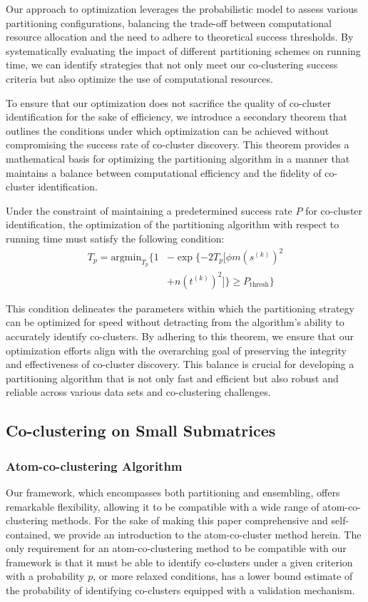 \documentclass[journal]{IEEEtran}
\begin{document}
Our approach to optimization leverages the probabilistic model to assess various partitioning configurations, balancing the trade-off between computational resource allocation and the need to adhere to theoretical success thresholds. By systematically evaluating the impact of different partitioning schemes on running time, we can identify strategies that not only meet our co-clustering success criteria but also optimize the use of computational resources.

To ensure that our optimization does not sacrifice the quality of co-cluster identification for the sake of efficiency, we introduce a secondary theorem that outlines the conditions under which optimization can be achieved without compromising the success rate of co-cluster discovery. This theorem provides a mathematical basis for optimizing the partitioning algorithm in a manner that maintains a balance between computational efficiency and the fidelity of co-cluster identification.


Under the constraint of maintaining a predetermined success rate $P$ for co-cluster identification, the optimization of the partitioning algorithm with respect to running time must satisfy the following condition:
\begin{align*}
  T_p = \text{argmin}_{T_p} \{
  1 & - \exp \{ -2 T_p [\phi m (s^{(k)})^2         \\
    & + n (t^{(k)})^2] \} \ge P_{\text{thresh}} \}
\end{align*}


This condition delineates the parameters within which the partitioning strategy can be optimized for speed without detracting from the algorithm's ability to accurately identify co-clusters. By adhering to this theorem, we ensure that our optimization efforts align with the overarching goal of preserving the integrity and effectiveness of co-cluster discovery. This balance is crucial for developing a partitioning algorithm that is not only fast and efficient but also robust and reliable across various data sets and co-clustering challenges.

\subsection{Co-clustering on Small Submatrices}


\subsubsection{Atom-co-clustering Algorithm}
Our framework, which encompasses both partitioning and ensembling, offers remarkable flexibility, allowing it to be compatible with a wide range of atom-co-clustering methods. For the sake of making this paper comprehensive and self-contained, we provide an introduction to the atom-co-cluster method herein. The only requirement for an atom-co-clustering method to be compatible with our framework is that it must be able to identify co-clusters under a given criterion with a probability $p$, or more relaxed conditions, has a lower bound estimate of the probability of identifying co-clusters equipped with a validation mechanism.
\end{document}
